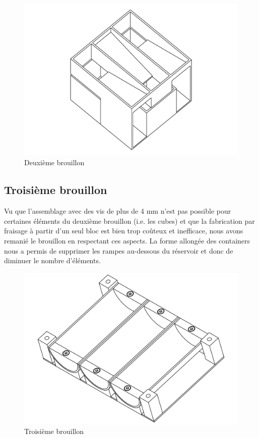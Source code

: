 \begin{figure}
    \centering
    \includegraphics[width=\textwidth]{Graphics/Reservoir_final/DEUXIEME_BROUILLON.pdf}
    \caption{Deuxième brouillon}
\end{figure}

\subsection{Troisième brouillon}
Vu que l'assemblage avec des vis de plus de 4 mm n'est pas possible pour certaines éléments du deuxième brouillon (i.e. les cubes) et que la fabrication par fraisage à partir d'un seul bloc est bien trop coûteux et inefficace, nous avons remanié le brouillon en respectant ces aspects. La forme allongée des containers nous a permis de supprimer les rampes au-dessous du réservoir et donc de diminuer le nombre d'éléments.

\begin{figure}
    \centering
    \includegraphics[width=\textwidth]{Graphics/Reservoir_final/TROISIEME_BROUILLON.pdf}
    \caption{Troisième brouillon}
\end{figure}

